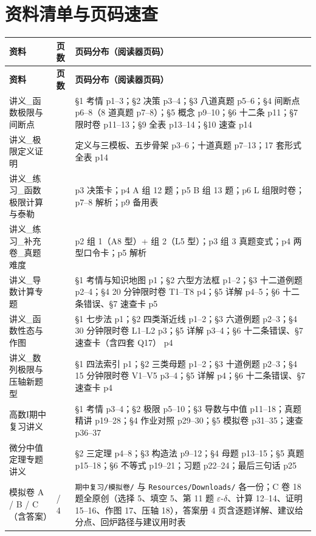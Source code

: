 \documentclass[11pt,a4paper]{ctexart}
\begin{document}
\section{资料清单与页码速查}

{\footnotesize
\renewcommand{\arraystretch}{1.12}
\begin{longtable}{@{}>{\raggedright\arraybackslash}p{4.6cm} >{\raggedright\arraybackslash}p{1.3cm} >{\raggedright\arraybackslash}p{9.1cm}@{}}
\toprule
\textbf{资料} & \textbf{页数} & \textbf{页码分布（阅读器页码）} \\
\midrule
\endfirsthead
\toprule
\textbf{资料} & \textbf{页数} & \textbf{页码分布（阅读器页码）} \\
\midrule
\endhead
讲义\_函数极限与间断点 & 14 & §1 考情 p1--3；§2 决策 p3--4；§3 八道真题 p5--6；§4 间断点 p6--8（8 道真题 p7--8）；§5 概念 p9--10；§6 十二条 p11；§7 限时卷 p11--13；§9 全表 p13--14；§10 速查 p14 \\
讲义\_极限定义证明 & 14 & 定义与三模板、五步骨架 p3--6；十道真题 p7--13；17 套形式全表 p14 \\
讲义\_练习\_函数极限计算与泰勒 & 9 & p3 决策卡；p4 A 组 12 题；p5 B 组 13 题；p6 L 组限时卷；p7--8 解析；p9 备用表 \\
讲义\_练习\_补充卷\_真题难度 & 5 & p2 组 1（A8 型）+ 组 2（L5 型）；p3 组 3 真题变式；p4 两型口令卡；p5 解析 \\
讲义\_导数计算专题 & 5 & §1 考情与知识地图 p1；§2 六型方法框 p1--2；§3 十二道例题 p2--4；§4 20 分钟限时卷 T1--T8 p4；§5 详解 p4--5；§6 十二条错误、§7 速查卡 p5 \\
讲义\_函数性态与作图 & 4 & §1 七步法 p1；§2 四类渐近线 p1--2；§3 六道例题 p2--3；§4 30 分钟限时卷 L1--L2 p3；§5 详解 p3--4；§6 十二条错误、§7 速查卡（含四套 Q17） p4 \\
讲义\_数列极限与压轴新题型 & 4 & §1 四法索引 p1；§2 三类母题 p1--2；§3 十道例题 p2--3；§4 15 分钟限时卷 V1--V5 p3--4；§5 详解 p4；§6 十二条错误、§7 速查卡 p4 \\
高数I期中复习讲义 & 37 & §1 考情 p3--4；§2 极限 p5--10；§3 导数与中值 p11--18；真题精讲 p19--28；§4 作业对照 p29--30；§5 模拟卷 p31--35；速查 p36--37 \\
微分中值定理专题讲义 & 25 & §2 三定理 p4--8；§3 构造法 p9--12；§4 母题 p13--15；§5 真题 p15--18；§6 不等式 p19--21；习题 p22--24；最后三句话 p25 \\
模拟卷 A / B / C（含答案） & 2 / 4 & \texttt{期中复习/模拟卷/} 与 \texttt{Resources/Downloads/} 各一份；C 卷 18 题全原创（选择 5、填空 5、第 11 题 $\varepsilon$-$\delta$、计算 12--14、证明 15--16、作图 17、压轴 18），答案册 4 页含逐题详解、建议给分点、回炉路径与建议用时表 \\

\end{longtable}}
\end{document}
